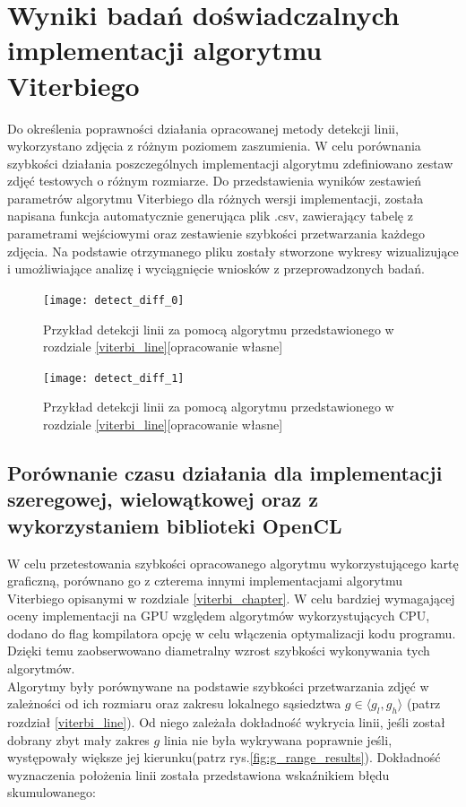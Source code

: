 \documentclass[document.tex]{subfiles}
\begin{document}
\chapter{Wyniki badań doświadczalnych \\ implementacji algorytmu Viterbiego} \label{chapter_3}
\indent Do określenia poprawności działania opracowanej metody detekcji linii, 
wykorzystano zdjęcia z różnym poziomem zaszumienia. W celu porównania szybkości
działania poszczególnych implementacji algorytmu zdefiniowano zestaw zdjęć testowych
o różnym rozmiarze. Do przedstawienia wyników zestawień parametrów algorytmu Viterbiego
dla różnych wersji implementacji, została napisana funkcja automatycznie generująca plik .csv,
zawierający tabelę z parametrami wejściowymi oraz zestawienie szybkości przetwarzania każdego zdjęcia.
Na podstawie otrzymanego pliku zostały stworzone wykresy wizualizujące i umożliwiające
analizę i wyciągnięcie wniosków z przeprowadzonych badań.

\begin{figure}[h]
\texttt{[image: detect\_diff\_0]}
\caption{Przykład detekcji linii za pomocą algorytmu przedstawionego w rozdziale \ref{viterbi_line}[opracowanie własne]}
\label{fig:sample_detect_0}
\end{figure}

\clearpage

\begin{figure}[h]
\texttt{[image: detect\_diff\_1]}
\caption{Przykład detekcji linii za pomocą algorytmu przedstawionego w rozdziale \ref{viterbi_line}[opracowanie własne]}
\label{fig:sample_detect_1}
\end{figure}

\section{Porównanie czasu działania dla implementacji szeregowej, wielowątkowej
oraz z wykorzystaniem biblioteki OpenCL}
\indent W celu przetestowania szybkości opracowanego algorytmu wykorzystującego
kartę graficzną, porównano go z czterema innymi implementacjami algorytmu Viterbiego opisanymi
w rozdziale \ref{viterbi_chapter}.
W celu bardziej wymagającej oceny implementacji na GPU względem algorytmów wykorzystujących CPU, dodano
do flag kompilatora opcję  w celu włączenia optymalizacji kodu programu.
Dzięki temu zaobserwowano diametralny wzrost szybkości wykonywania tych algorytmów.
\\
\indent Algorytmy były porównywane na podstawie szybkości przetwarzania zdjęć
w zależności od ich rozmiaru oraz zakresu lokalnego sąsiedztwa $g\in \langle g_l, g_h \rangle$
(patrz rozdział \ref{viterbi_line}). Od niego zależała dokładność wykrycia linii, 
jeśli został dobrany zbyt mały zakres $g$ linia nie była wykrywana poprawnie jeśli, 
występowały większe jej kierunku(patrz rys.\ref{fig:g_range_results}). Dokładność wyznaczenia położenia linii
została przedstawiona wskaźnikiem błędu skumulowanego:
\end{document}
